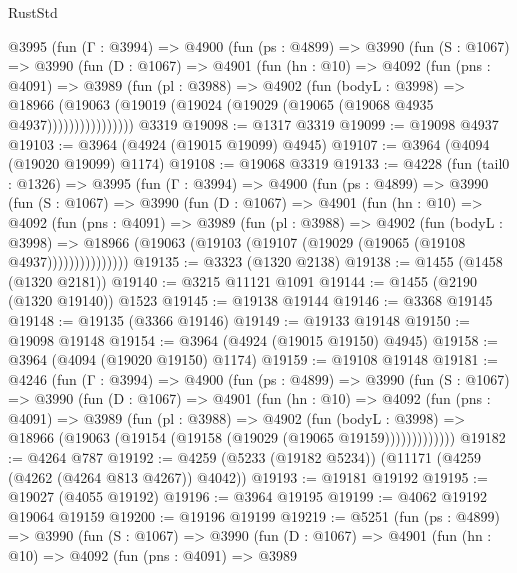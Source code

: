 \begin{lexlean}{RustStd}
\begin{coremodule}
      @3995
        (fun (Γ : @3994) =>
        @4900
          (fun (ps : @4899) =>
          @3990
            (fun (S : @1067) =>
            @3990
              (fun (D : @1067) =>
              @4901
                (fun (hn : @10) =>
                @4092
                  (fun (pns : @4091) =>
                  @3989
                    (fun (pl : @3988) =>
                    @4902
                      (fun (bodyL : @3998) =>
                      @18966
                        (@19063 (@19019 (@19024 (@19029 (@19065 (@19068 @4935 @4937))))))))))))))))
    @3319
@19098 := @1317 @3319
@19099 := @19098 @4937
@19103 := @3964 (@4924 (@19015 @19099) @4945)
@19107 := @3964 (@4094 (@19020 @19099) @1174)
@19108 := @19068 @3319
@19133 := @4228
    (fun (tail0 : @1326) =>
    @3995
      (fun (Γ : @3994) =>
      @4900
        (fun (ps : @4899) =>
        @3990
          (fun (S : @1067) =>
          @3990
            (fun (D : @1067) =>
            @4901
              (fun (hn : @10) =>
              @4092
                (fun (pns : @4091) =>
                @3989
                  (fun (pl : @3988) =>
                  @4902
                    (fun (bodyL : @3998) =>
                    @18966 (@19063 (@19103 (@19107 (@19029 (@19065 (@19108 @4937)))))))))))))))
@19135 := @3323 (@1320 @2138)
@19138 := @1455 (@1458 (@1320 @2181))
@19140 := @3215 @11121 @1091
@19144 := @1455 (@2190 (@1320 @19140)) @1523
@19145 := @19138 @19144
@19146 := @3368 @19145
@19148 := @19135 (@3366 @19146)
@19149 := @19133 @19148
@19150 := @19098 @19148
@19154 := @3964 (@4924 (@19015 @19150) @4945)
@19158 := @3964 (@4094 (@19020 @19150) @1174)
@19159 := @19108 @19148
@19181 := @4246
    (fun (Γ : @3994) =>
    @4900
      (fun (ps : @4899) =>
      @3990
        (fun (S : @1067) =>
        @3990
          (fun (D : @1067) =>
          @4901
            (fun (hn : @10) =>
            @4092
              (fun (pns : @4091) =>
              @3989
                (fun (pl : @3988) =>
                @4902
                  (fun (bodyL : @3998) =>
                  @18966 (@19063 (@19154 (@19158 (@19029 (@19065 @19159)))))))))))))
@19182 := @4264 @787
@19192 := @4259 (@5233 (@19182 @5234)) (@11171 (@4259 (@4262 (@4264 @813 @4267)) @4042))
@19193 := @19181 @19192
@19195 := @19027 (@4055 @19192)
@19196 := @3964 @19195
@19199 := @4062 @19192 @19064 @19159
@19200 := @19196 @19199
@19219 := @5251
    (fun (ps : @4899) =>
    @3990
      (fun (S : @1067) =>
      @3990
        (fun (D : @1067) =>
        @4901
          (fun (hn : @10) =>
          @4092
            (fun (pns : @4091) =>
            @3989

\end{coremodule}
\end{lexlean}
